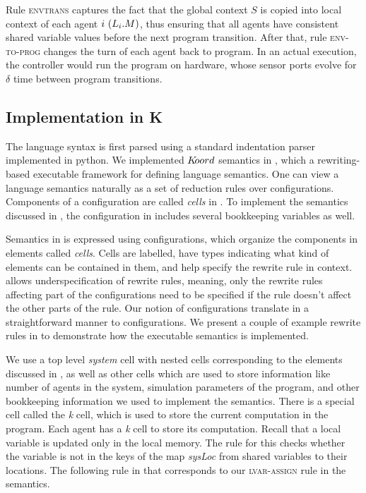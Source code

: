     
Rule \textsc{envtrans} captures the fact that the global context $S$ is copied into local context of each agent $i \ (L_{i}.M)$, thus ensuring that all agents have consistent shared variable values before the next program transition. After that, rule \textsc{env-to-prog} changes the turn of each agent back to program. In an actual execution, the controller  would run the program on hardware, whose sensor ports evolve for $\delta$ time between program transitions. 
\subsection{Implementation in K}

The language syntax is first parsed using a standard indentation parser implemented in python. We implemented $K\kern-2pt oord$ semantics in \K, which a rewriting-based executable framework for defining language semantics. One can view a language semantics naturally as a set of reduction rules over configurations. Components of a configuration are called {\em cells} in \K. To implement the semantics discussed in , the configuration in \K includes several bookkeeping variables as well. 


Semantics in \K is expressed using configurations, which organize the components in elements called {\em cells}. Cells are labelled, have types indicating what kind of elements can be contained in them, and help specify the rewrite rule in context. \K allows underspecification of rewrite rules, meaning, only the rewrite rules affecting part of the configurations need to be specified if the rule doesn't affect the other parts of the rule. Our notion of configurations translate in a straightforward manner to \K configurations. We present a couple of example rewrite rules in \K to demonstrate how the executable semantics is implemented.  


We use a top level {\em system} cell with nested cells corresponding to the elements discussed in , as well as other cells which are used to store information like number of agents in the system, simulation parameters of the program, and other bookkeeping information we used to implement the semantics. There is a special cell called the {\em k} cell, which is used to store the current computation in the program. Each agent has a {\em k} cell to store its computation. Recall that a local variable is updated only in the local memory. The rule for this checks whether the variable is not in the keys of the map {\em sysLoc} from shared variables to their locations. The following rule in \K that corresponds to our \textsc{lvar-assign} rule in the semantics. 


